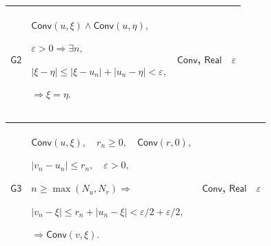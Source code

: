 \documentclass[11pt]{amsart}
\newlength{\FTCFourColumnBody}
\begin{document}
{\begin{tabular}
\end{tabular}%
\par\setlength{\parskip}{0pt}\nointerlineskip
\noindent
\begin{tabular}{|@{}>{\centering\arraybackslash}m{0.078431\FTCFourColumnBody}|>{\centering\arraybackslash}m{0.535947\FTCFourColumnBody}|>{\centering\arraybackslash}m{0.281045\FTCFourColumnBody}|>{\centering\arraybackslash}m{0.104575\FTCFourColumnBody}|}\hline
\hypertarget{proof:G2}{$\displaystyle \textsf{G2}$} & $\displaystyle \textsf{Conv}(u,\xi)\land\textsf{Conv}(u,\eta),$\par
$\displaystyle \varepsilon>0\Rightarrow\exists n,$\par
$\displaystyle |\xi-\eta|\le|\xi-u_n|+|u_n-\eta|<\varepsilon,$\par
$\displaystyle \Rightarrow\xi=\eta.$ & \hyperlink{def:Conv}{$\displaystyle \textsf{Conv}$}, \hyperlink{ax:Real}{$\displaystyle \textsf{Real}$} & $\displaystyle \varepsilon$\\ \hline
\end{tabular}%
\par\setlength{\parskip}{0pt}\nointerlineskip
\noindent
\begin{tabular}{|@{}>{\centering\arraybackslash}m{0.078431\FTCFourColumnBody}|>{\centering\arraybackslash}m{0.535947\FTCFourColumnBody}|>{\centering\arraybackslash}m{0.281045\FTCFourColumnBody}|>{\centering\arraybackslash}m{0.104575\FTCFourColumnBody}|}\hline
\hypertarget{proof:G3}{$\displaystyle \textsf{G3}$} & $\displaystyle \textsf{Conv}(u,\xi),\quad r_n\ge0,\quad\textsf{Conv}(r,0),$\par
$\displaystyle |v_n-u_n|\le r_n,\quad\varepsilon>0,$\par
$\displaystyle n\ge\max(N_u,N_r)\Rightarrow$\par
$\displaystyle |v_n-\xi|\le r_n+|u_n-\xi|<\varepsilon/2+\varepsilon/2,$\par
$\displaystyle \Rightarrow\textsf{Conv}(v,\xi).$ & \hyperlink{def:Conv}{$\displaystyle \textsf{Conv}$}, \hyperlink{ax:Real}{$\displaystyle \textsf{Real}$} & $\displaystyle \varepsilon$\\ \hline
\end{tabular}%
\par
}
\end{document}
